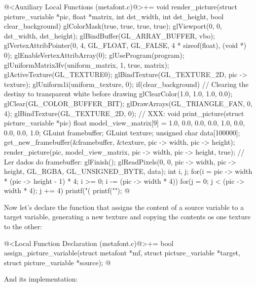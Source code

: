 {{{{{\iniciocodigo
@<Auxiliary Local Functions (metafont.c)@>+=
void render_picture(struct picture_variable *pic, float *matrix, int dst_width,
                    int dst_height, bool clear_background){
  glColorMask(true, true, true, true);
  glViewport(0, 0, dst_width, dst_height);
  glBindBuffer(GL_ARRAY_BUFFER, vbo);
  glVertexAttribPointer(0, 4, GL_FLOAT, GL_FALSE, 4 * sizeof(float), (void *) 0);
  glEnableVertexAttribArray(0);
  glUseProgram(program);
  glUniformMatrix3fv(uniform_matrix, 1, true, matrix);
  glActiveTexture(GL_TEXTURE0);
  glBindTexture(GL_TEXTURE_2D, pic -> texture);
  glUniform1i(uniform_texture, 0);
  if(clear_background){
    // Clearing the destiny to transparent white before drawing
    glClearColor(1.0, 1.0, 1.0, 0.0);
    glClear(GL_COLOR_BUFFER_BIT);
  }
  glDrawArrays(GL_TRIANGLE_FAN, 0, 4);
  glBindTexture(GL_TEXTURE_2D, 0);
}
// XXX:
void print_picture(struct picture_variable *pic){
  float model_view_matrix[9] = {1.0, 0.0, 0.0,
                               0.0, 1.0, 0.0,
                               0.0, 0.0, 1.0};
  GLuint framebuffer;
  GLuint texture;
  unsigned char data[100000];
  get_new_framebuffer(&framebuffer, &texture, pic -> width, pic -> height);
  render_picture(pic, model_view_matrix, pic -> width, pic -> height, true);
  // Ler dados do framebuffer:
  glFinish();
  glReadPixels(0, 0, pic -> width, pic -> height, GL_RGBA, GL_UNSIGNED_BYTE, data);
  {
    int i, j;
    for(i = pic -> width * (pic -> height - 1) * 4;
        i >= 0; i -= (pic -> width * 4)){
      for(j = 0; j < (pic -> width * 4); j += 4)
        printf("(%
        printf("\n");
    }
  }
}
@
\fimcodigo

Now let's declare the function that assigns the content of a source
variable to a target variable, generating a new texture and copying
the contents os one texture to the other:

\iniciocodigo
@<Local Function Declaration (metafont.c)@>+=
bool assign_picture_variable(struct metafont *mf,
                             struct picture_variable *target,
                             struct picture_variable *source);
@
\fimcodigo

And its implementation:

}}}}}

